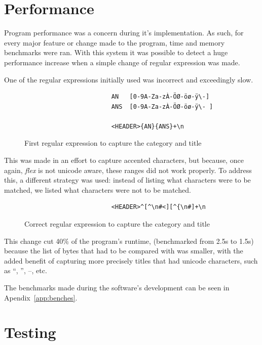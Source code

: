 \documentclass[a4paper]{report}
\begin{document}
\chapter{Performance}

Program performance was a concern during it's implementation. As such, for every
major feature or change made to the program, time and memory benchmarks were
ran. With this system it was possible to detect a huge performance increase
when a simple change of regular expression was made.

One of the regular expressions initially used was incorrect and exceedingly slow.
\begin{figure}[H]
    \centering
    \begin{verbatim}
                        AN   [0-9A-Za-zÀ-ÖØ-öø-ÿ\-]
                        ANS  [0-9A-Za-zÀ-ÖØ-öø-ÿ\- ]

                        <HEADER>{AN}{ANS}+\n
    \end{verbatim}
    \caption{First regular expression to capture the category and title}
\end{figure}

This was made in an effort to capture accented characters, but because, once
again, \textit{flex} is not unicode aware, these ranges did not work properly.
To address this, a different strategy was used: instead of listing what
characters were to be matched, we listed what characters were not to be
matched.

\begin{figure}[H]
    \centering
    \begin{verbatim}
                        <HEADER>^[^\n#<][^{\n#]+\n
    \end{verbatim}
    \caption{Correct regular expression to capture the category and
    title}\label{fig:new-regex}
\end{figure}

This change cut 40\% of the program's runtime, (benchmarked from 2.5s to 1.5s)
because the list of bytes that had to be compared with was smaller, with the
added benefit of capturing more precisely titles that had unicode characters,
such as  ``,  '', --, etc.

The benchmarks made during the software's development can be seen in
Apendix~\ref{app:benches}.

\chapter{Testing}
\end{document}
